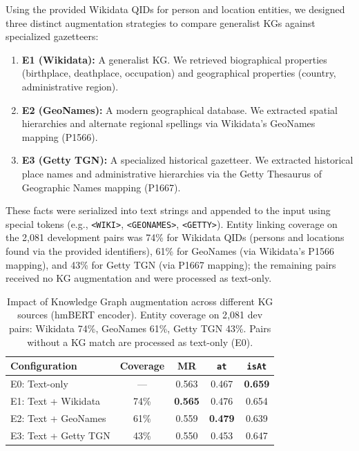 \documentclass[11pt,a4paper]{article}
\begin{document}
Using the provided Wikidata QIDs for person and location entities, we designed three distinct augmentation strategies to compare generalist KGs against specialized gazetteers:
\begin{enumerate}
    \item \textbf{E1 (Wikidata):} A generalist KG. We retrieved biographical properties (birthplace, deathplace, occupation) and geographical properties (country, administrative region).
    \item \textbf{E2 (GeoNames):} A modern geographical database. We extracted spatial hierarchies and alternate regional spellings via Wikidata's GeoNames mapping (P1566).
    \item \textbf{E3 (Getty TGN):} A specialized historical gazetteer. We extracted historical place names and administrative hierarchies via the Getty Thesaurus of Geographic Names mapping (P1667).
\end{enumerate}

These facts were serialized into text strings and appended to the input using special tokens (e.g., \texttt{<WIKI>}, \texttt{<GEONAMES>}, \texttt{<GETTY>}). Entity linking coverage on the 2{,}081 development pairs was 74\% for Wikidata QIDs (persons and locations found via the provided identifiers), 61\% for GeoNames (via Wikidata's P1566 mapping), and 43\% for Getty TGN (via P1667 mapping); the remaining pairs received no KG augmentation and were processed as text-only.

\begin{table}[t]
\centering
\caption{Impact of Knowledge Graph augmentation across different KG sources (hmBERT encoder). Entity coverage on 2{,}081 dev pairs: Wikidata 74\%, GeoNames 61\%, Getty TGN 43\%. Pairs without a KG match are processed as text-only (E0).}
\label{tab:kg}
\begin{tabular}{lcccc}
\toprule
\textbf{Configuration} & \textbf{Coverage} & \textbf{MR} & \textbf{\texttt{at}} & \textbf{\texttt{isAt}} \\
\midrule
E0: Text-only & --- & 0.563 & 0.467 & \textbf{0.659} \\
E1: Text + Wikidata & 74\% & \textbf{0.565} & 0.476 & 0.654 \\
E2: Text + GeoNames & 61\% & 0.559 & \textbf{0.479} & 0.639 \\
E3: Text + Getty TGN & 43\% & 0.550 & 0.453 & 0.647 \\
\bottomrule
\end{tabular}
\end{table}
\end{document}
